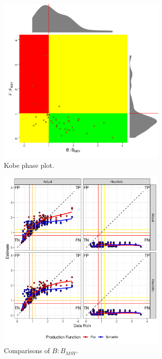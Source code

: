 \begin{figure}[ht!]
\centering
\includegraphics[width=0.75\textwidth]{figs/kobe-1.png}
\caption{Kobe phase plot.}
\label{fig:kobe}
\end{figure}

\begin{figure}[ht!]
\centering
\includegraphics[width=0.75\textwidth]{figs/cf-1.png}
\caption{Comparisons of $B:B_{MSY}$.}
\label{fig:cf}
\end{figure}


